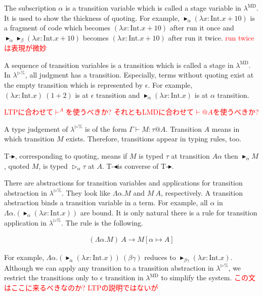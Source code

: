 \documentclass[runningheads]{llncs}
\newcommand{\red}[1]{\textcolor{red}{#1 }}
\newcommand{\LTP}{$\lambda^{\triangleright\%}$\xspace}
\newcommand{\LMD}{$\lambda^{\textrm{MD}}$\xspace}
\newcommand{\G}{\Gamma}
\newcommand{\TW}{\triangleright}
\newcommand{\TB}{\blacktriangleright}
\newcommand{\TBL}{\blacktriangleleft}
\newcommand{\TTB}{\textsc{T-$\TB$}}
\newcommand{\TTBL}{\textsc{T-$\TBL$}}
\newcommand{\I}{\textrm{Int}}
\begin{document}

The subscription $\alpha$ is a transition variable which is called a stage variable in \LMD.
It is used to show the thickness of quoting.
For example, $\TB_\alpha (\lambda x:\I.x+10)$ is a fragment of code which becomes $(\lambda x:\I.x+10)$ after run it once and
$\TB_\alpha \TB_\beta (\lambda x:\I.x+10)$ becomes $(\lambda x:\I.x+10)$ after run it twice.
\red{run twiceは表現が微妙}


A sequence of transition variables is a transition which is called a stage in \LMD.
In \LTP, all judgment has a transition.
Especially, terms without quoting exist at the empty transition which is represented by $\epsilon$.
For example, $(\lambda x:\I.x)\ (1+2)$ is at $\epsilon$ transition and 
$\TB_\alpha (\lambda x:\I.x)$ is at $\alpha$ transition.


\red{LTPに合わせて$\vdash^A$を使うべきか? それともLMDに合わせて$\vdash @ A$を使うべきか?}

A type judgement of \LTP is of the form $\G \vdash M : \tau @ A$.
Transition $A$ means in which transition $M$ exists.
Therefore, transitions appear in typing rules, too.
\begin{center}
    \infrule{\G\vdash M:\tau @{A\alpha}}{\G\vdash \TB_{\alpha}M:\TW_{\alpha}\tau @A}{\TTB} \andalso
    \infrule{\G\vdash M:\TW_{\alpha}\tau @A}{\G\vdash \TBL_{\alpha}M:\tau @{A\alpha}}{\TTBL}
\end{center}
\TTB, corresponding to quoting, means 
if $M$ is typed $\tau$ at transition $A\alpha$ then $\TB_{\alpha}M$, quoted $M$, is typed $\TW_{\alpha}\tau$ at $A$.
\TTBL is converse of \TTB.


There are abstractions for transition variables and applications for transition abstraction in \LTP.
They look like $\Lambda\alpha.M$ and $M\ A$, respectively.
A transition abstraction binds a transition variable in a term.
For example, all $\alpha$ in $\Lambda\alpha.(\TB_\alpha (\lambda x:\I.x))$ are bound.
It is only natural there is a rule for transition application in \LTP.
The rule is the following.

\begin{align*}
    (\Lambda\alpha.M)\ A \longrightarrow M[\alpha\mapsto A]
\end{align*}

For example, $\Lambda\alpha.(\TB_\alpha (\lambda x:\I.x))\ (\beta\gamma)$ reduces to $\TB_{\beta\gamma} (\lambda x:\I.x)$.
Although we can apply any transition to a transition abstraction in \LTP,
we restrict the transitions only to $\epsilon$ transition in \LMD to simplify the system.
\red{この文はここに来るべきなのか? LTPの説明ではないが}
\end{document}
